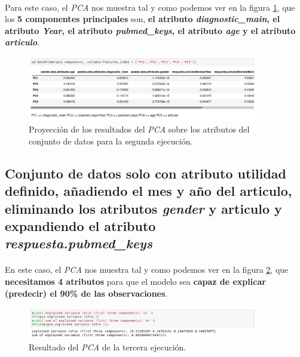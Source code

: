 \paragraph{}
Para este caso, el \textit{PCA} nos muestra tal y como podemos ver en la figura \ref{pcaTwoAtributos}, que los \textbf{5 componentes principales} son, \textbf{el atributo \textit{diagnostic\_main}, el atributo \textit{Year}, el atributo \textit{pubmed\_keys}, el atributo \textit{age} y el atributo \textit{articulo}}.

\begin{figure}[!htb]
  \centering
    \includegraphics[width=0.9\textwidth]{images/resultados_procesado_de_datos_pca2_atributos.png}
    \caption{Proyección de los resultados del \textit{PCA} sobre los atributos del conjunto de datos para la segunda ejecución.}
  \label{pcaTwoAtributos}
\end{figure}

\subsection{Conjunto de datos solo con atributo utilidad definido, añadiendo el mes y año del articulo, eliminando los atributos \textit{gender} y articulo y expandiendo el atributo \textit{respuesta.pubmed\_keys}}

\paragraph{}
En este caso, el \textit{PCA} nos muestra tal y como podemos ver en la figura \ref{pcaThreeResult}, que \textbf{necesitamos 4 atributos} para que el modelo sea \textbf{capaz de explicar (predecir) el 90\% de las observaciones}.

\begin{figure}[!htb]
  \centering
    \includegraphics[width=0.9\textwidth]{images/resultados_procesado_de_datos_pca3_result.png}
    \caption{Resultado del \textit{PCA} de la tercera ejecución.}
  \label{pcaThreeResult}
\end{figure}

